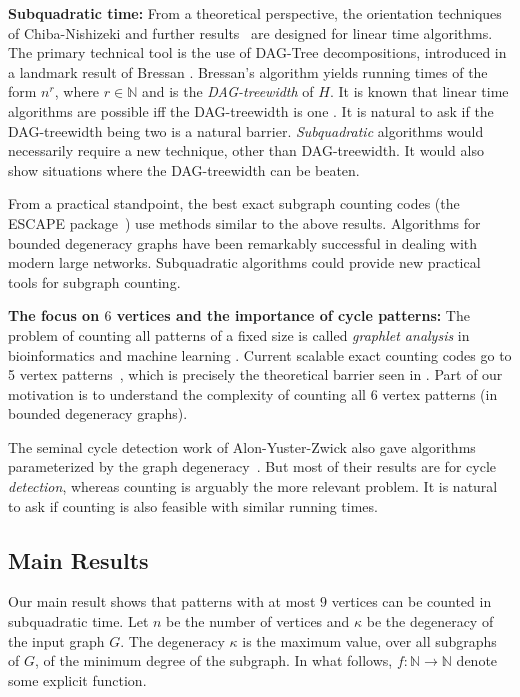 \documentclass[a4paper,UKenglish,cleveref, autoref, numberwithinsect, thm-restate]{lipics-v2021}
\newcommand{\degen}{\kappa}
\newcommand{\NN}{\mathbb{N}}
\begin{document}
	{\bf Subquadratic time:} From a theoretical perspective, the orientation techniques of
	Chiba-Nishizeki and further results~\cite{ChNi85,BePaSe20,BePaSe21,BeGiLe+22} are designed for linear time algorithms.
	The primary technical tool is the use of DAG-Tree decompositions, introduced
	in a landmark result of Bressan \cite{Br19,Br21}. Bressan's algorithm yields running times
	of the form $n^r$, where $r \in \NN$ and is the \emph{DAG-treewidth} of $H$.
	It is known that linear time algorithms are possible iff the DAG-treewidth is one \cite{BeGiLe+22}.
	It is natural to ask if the DAG-treewidth being two is a natural barrier. 
	\emph{Subquadratic} algorithms would necessarily require a new technique, other than
	DAG-treewidth. It would also show situations where the DAG-treewidth can be beaten.
	
	From a practical standpoint, the best exact subgraph counting codes (the ESCAPE package~\cite{escape}) use methods similar to the above results. Algorithms for bounded degeneracy graphs have been remarkably successful in dealing with modern large networks. Subquadratic algorithms could provide new practical tools for subgraph counting.
	
	{\bf The focus on $6$ vertices and the importance of cycle patterns:} The problem
	of counting all patterns of a fixed size is called \emph{graphlet analysis}
	in bioinformatics and machine learning \cite{Pr07,ShViPe+09}. Current scalable exact counting codes go to
	5 vertex patterns~\cite{escape}, which is precisely the theoretical barrier seen in \cite{BePaSe20}.
	Part of our motivation is to understand the complexity of counting all $6$ vertex patterns
	(in bounded degeneracy graphs). 
	
	The seminal cycle detection work of Alon-Yuster-Zwick also gave algorithms 
	parameterized by the graph degeneracy~\cite{AlYuZw97}. But most of their results are for cycle \emph{detection}, whereas counting is arguably the more relevant problem. It is natural to ask if counting is also feasible with similar running times.
	
	\subsection{Main Results} \label{sec:results}
	
	Our main result shows that patterns with at most $9$ vertices can be counted in subquadratic time. Let $n$ be the number of vertices and $\degen$ be the degeneracy of the input graph $G$.
    The degeneracy $\kappa$ is the maximum value, over all subgraphs of $G$, of the minimum degree of the subgraph.
    In what follows, $f:\NN \to \NN$ denote some explicit function.
\end{document}
